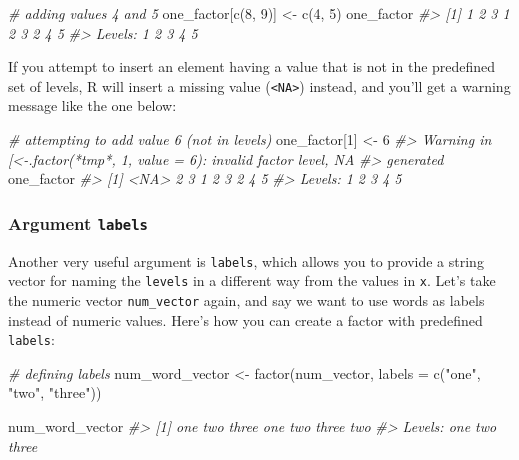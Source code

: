 \documentclass[
]{book}
\newenvironment{Shaded}{\begin{snugshade}}{\end{snugshade}}
\newcommand{\AttributeTok}[1]{\textcolor[rgb]{0.77,0.63,0.00}{#1}}
\newcommand{\CommentTok}[1]{\textcolor[rgb]{0.56,0.35,0.01}{\textit{#1}}}
\newcommand{\DecValTok}[1]{\textcolor[rgb]{0.00,0.00,0.81}{#1}}
\newcommand{\FunctionTok}[1]{\textcolor[rgb]{0.00,0.00,0.00}{#1}}
\newcommand{\NormalTok}[1]{#1}
\newcommand{\OtherTok}[1]{\textcolor[rgb]{0.56,0.35,0.01}{#1}}
\newcommand{\StringTok}[1]{\textcolor[rgb]{0.31,0.60,0.02}{#1}}
\begin{document}
\begin{Shaded}
\begin{Highlighting}[]
\CommentTok{\# adding values 4 and 5}
\NormalTok{one\_factor[}\FunctionTok{c}\NormalTok{(}\DecValTok{8}\NormalTok{, }\DecValTok{9}\NormalTok{)] }\OtherTok{\textless{}{-}} \FunctionTok{c}\NormalTok{(}\DecValTok{4}\NormalTok{, }\DecValTok{5}\NormalTok{)}
\NormalTok{one\_factor}
\CommentTok{\#\textgreater{} [1] 1 2 3 1 2 3 2 4 5}
\CommentTok{\#\textgreater{} Levels: 1 2 3 4 5}
\end{Highlighting}
\end{Shaded}

If you attempt to insert an element having a value that is not in the
predefined set of levels, R will insert a missing value (\texttt{\textless{}NA\textgreater{}}) instead, and
you'll get a warning message like the one below:

\begin{Shaded}
\begin{Highlighting}[]
\CommentTok{\# attempting to add value 6 (not in levels)}
\NormalTok{one\_factor[}\DecValTok{1}\NormalTok{] }\OtherTok{\textless{}{-}} \DecValTok{6}
\CommentTok{\#\textgreater{} Warning in \textasciigrave{}[\textless{}{-}.factor\textasciigrave{}(\textasciigrave{}*tmp*\textasciigrave{}, 1, value = 6): invalid factor level, NA}
\CommentTok{\#\textgreater{} generated}
\NormalTok{one\_factor}
\CommentTok{\#\textgreater{} [1] \textless{}NA\textgreater{} 2    3    1    2    3    2    4    5   }
\CommentTok{\#\textgreater{} Levels: 1 2 3 4 5}
\end{Highlighting}
\end{Shaded}

\hypertarget{argument-labels}{%
\subsubsection*{\texorpdfstring{Argument \texttt{labels}}{Argument labels}}\label{argument-labels}}

Another very useful argument is \texttt{labels}, which allows you to provide a string
vector for naming the \texttt{levels} in a different way from the values in \texttt{x}. Let's
take the numeric vector \texttt{num\_vector} again, and say we want to use words as
labels instead of numeric values. Here's how you can create a factor with
predefined \texttt{labels}:

\begin{Shaded}
\begin{Highlighting}[]
\CommentTok{\# defining labels}
\NormalTok{num\_word\_vector }\OtherTok{\textless{}{-}} \FunctionTok{factor}\NormalTok{(num\_vector, }\AttributeTok{labels =} \FunctionTok{c}\NormalTok{(}\StringTok{"one"}\NormalTok{, }\StringTok{"two"}\NormalTok{, }\StringTok{"three"}\NormalTok{))}

\NormalTok{num\_word\_vector}
\CommentTok{\#\textgreater{} [1] one   two   three one   two   three two  }
\CommentTok{\#\textgreater{} Levels: one two three}
\end{Highlighting}
\end{Shaded}
\end{document}
